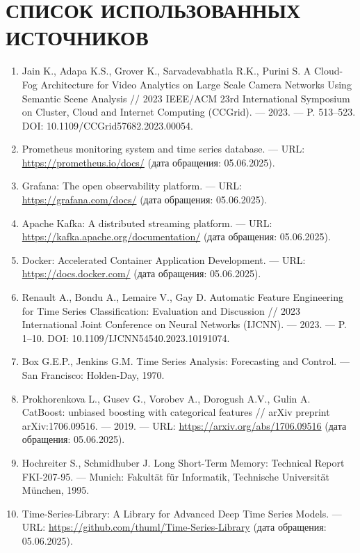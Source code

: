 \chapter*{СПИСОК ИСПОЛЬЗОВАННЫХ ИСТОЧНИКОВ}


\begin{enumerate}[label=\arabic*)\hspace{1em}, leftmargin=1cm, itemsep=0em]
	\item Jain K., Adapa K.S., Grover K., Sarvadevabhatla R.K., Purini S. A Cloud-Fog Architecture for Video Analytics on Large Scale Camera Networks Using Semantic Scene Analysis // 2023 IEEE/ACM 23rd International Symposium on Cluster, Cloud and Internet Computing (CCGrid). — 2023. — P. 513–523. DOI: 10.1109/CCGrid57682.2023.00054.
	\item Prometheus monitoring system and time series database. — URL: \url{https://prometheus.io/docs/} (дата обращения: 05.06.2025).
	\item Grafana: The open observability platform. — URL: \url{https://grafana.com/docs/} (дата обращения: 05.06.2025).
	\item Apache Kafka: A distributed streaming platform. — URL: \url{https://kafka.apache.org/documentation/} (дата обращения: 05.06.2025).
	\item Docker: Accelerated Container Application Development. — URL: \url{https://docs.docker.com/} (дата обращения: 05.06.2025).
	\item Renault A., Bondu A., Lemaire V., Gay D. Automatic Feature Engineering for Time Series Classification: Evaluation and Discussion // 2023 International Joint Conference on Neural Networks (IJCNN). — 2023. — P. 1–10. DOI: 10.1109/IJCNN54540.2023.10191074.
	\item Box G.E.P., Jenkins G.M. Time Series Analysis: Forecasting and Control. — San Francisco: Holden-Day, 1970.
	\item Prokhorenkova L., Gusev G., Vorobev A., Dorogush A.V., Gulin A. CatBoost: unbiased boosting with categorical features // arXiv preprint arXiv:1706.09516. — 2019. — URL: \url{https://arxiv.org/abs/1706.09516} (дата обращения: 05.06.2025).
	\item Hochreiter S., Schmidhuber J. Long Short-Term Memory: Technical Report FKI-207-95. — Munich: Fakultät für Informatik, Technische Universität München, 1995.
	\item Time-Series-Library: A Library for Advanced Deep Time Series Models. — URL: \url{https://github.com/thuml/Time-Series-Library} (дата обращения: 05.06.2025).

\end{enumerate}
